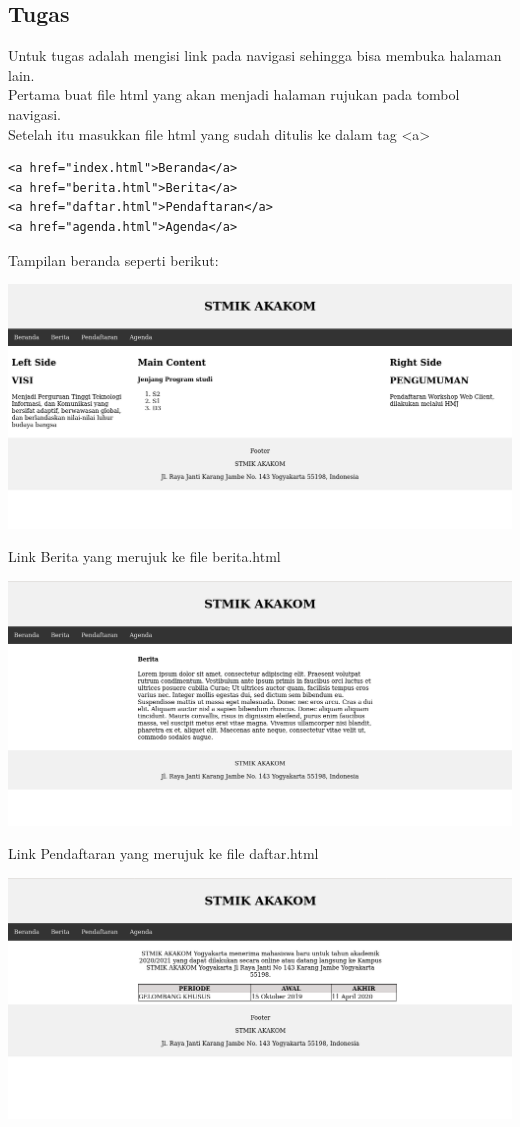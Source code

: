 \documentclass[a4paper,12pt]{article}
\begin{document}
\subsection{Tugas}
Untuk tugas adalah mengisi link pada navigasi sehingga bisa membuka halaman lain.\\
Pertama buat file html yang akan menjadi halaman rujukan pada tombol navigasi.\\
Setelah itu masukkan file html yang sudah ditulis ke dalam tag <a>
\begin{lstlisting}
<a href="index.html">Beranda</a>
<a href="berita.html">Berita</a>
<a href="daftar.html">Pendaftaran</a>
<a href="agenda.html">Agenda</a>
\end{lstlisting}
Tampilan beranda seperti berikut:\\
\begin{center}
    \includegraphics[width=\linewidth]{6.png}
\end{center}
Link Berita yang merujuk ke file berita.html
\begin{center}
    \includegraphics[width=\linewidth]{7.png}
\end{center}
Link Pendaftaran yang merujuk ke file daftar.html
\begin{center}
    \includegraphics[width=\linewidth]{8.png}
\end{center}
\end{document}
